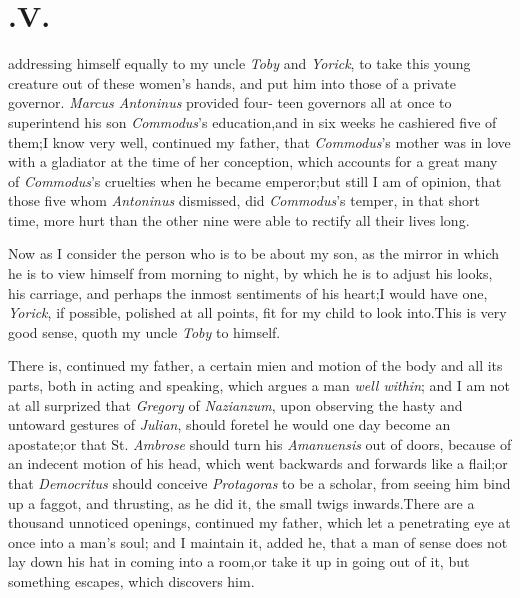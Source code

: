 \documentclass{article}
\begin{document}
\enlargethispage\baselineskip

\section{.\enspace V.}

\vskip -6pt

 \break
addressing himself equally to my uncle \textit{Toby} and
\textit{Yorick}, to take this young creature out of these
women’s hands, and put him into those of a private governor.
\textit{Marcus Antoninus} provided four- teen governors all at once to
superintend his son \textit{Commodus}’s education,\tsk and in
six weeks he cashiered five of them;\tsk \break I know very well,
continued my father, that \textit{Commodus}’s mother was in
love with a gladiator at the time of her conception, which accounts
for a great many of \textit{Commodus}’s cruelties when he
became emperor;\tsk but still I am of opinion, that those five
whom \textit{Antoninus} dismissed, did \textit{Commodus}’s
temper, in that short time, more hurt than the other nine were able
to rectify all their lives long.

Now as I consider the person who is to be about my son, as the
mirror in which he is to view himself from morning to night,
by which he is to adjust his looks, his carriage, and perhaps the
inmost sentiments of his heart;\tsk I would have one,
\textit{Yorick}, if possible, polished at all points, fit for my
child to look into.\break\tsh This is very good sense, quoth my
uncle \textit{Toby} to himself.

\tsh There is, continued my father,\break
a certain mien and motion of the body\break
and all its parts, both in acting and\break
speaking, which argues a man \textit{well\break
within}; and I am not at all surprized\break
that \textit{Gregory} of \textit{Nazianzum}, upon ob\-serving
the hasty and untoward gestures of \textit{Julian}, should foretel he
would one day become an apostate;\tsh or that St.\break
\textit{Ambrose} should turn his \textit{Amanuensis} out of doors,
because of an indecent motion of his head, which went backwards and
forwards like a flail;\tsh or that \textit{Democritus}
should conceive \textit{Protagoras} to be a scholar, from seeing him
bind up a faggot, and thrusting, as he did it,\break
the small twigs inwards.\tsh There are a thousand unnoticed openings,
continued my father, which let a penetrating eye at once into
a man’s soul; and I maintain it, added he, that a man of
sense does not lay down his hat in coming into a room,\tsk or
take it up in going out of it, but something escapes, which
discovers him.
\end{document}
